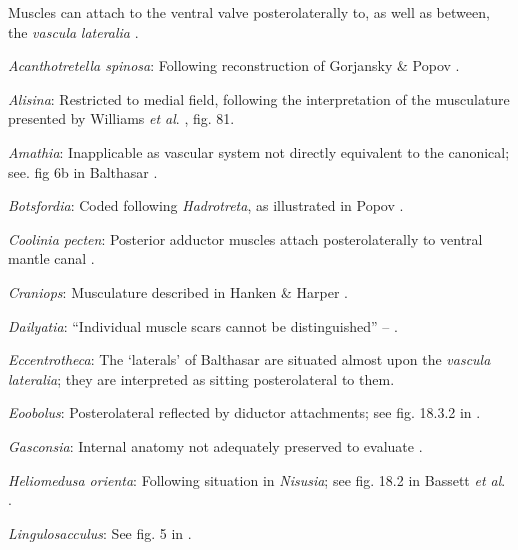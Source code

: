 \documentclass[openany]{book}
\theoremstyle{definition}
\theoremstyle{definition}
\theoremstyle{definition}
\theoremstyle{remark}
\begin{document}
Muscles can attach to the ventral valve posterolaterally to, as well as
between, the \emph{vascula} \emph{lateralia}
\citep{Popov1992TheCambrian}.

\hypertarget{Acanthotretella_spinosa-coding-74}{}
\emph{Acanthotretella spinosa}: Following reconstruction of Gorjansky \&
Popov \citeyearpar{Gorjansky1986Onthe}.

\hypertarget{Alisina-coding-74}{}
\emph{Alisina}: Restricted to medial field, following the interpretation
of the musculature presented by Williams \emph{et al}.
\citeyearpar{Williams2000LinguliformeaCraniiformea}, fig. 81.

\hypertarget{Amathia-coding-74}{}
\emph{Amathia}: Inapplicable as vascular system not directly equivalent
to the canonical; see. fig 6b in Balthasar
\citeyearpar{Balthasar2009Thebrachiopod}.

\hypertarget{Botsfordia-coding-74}{}
\emph{Botsfordia}: Coded following \emph{Hadrotreta}, as illustrated in
Popov \citeyearpar{Popov1992TheCambrian}.

\hypertarget{Coolinia_pecten-coding-74}{}
\emph{Coolinia pecten}: Posterior adductor muscles attach
posterolaterally to ventral mantle canal \citep{Robinson2014Themuscles}.

\hypertarget{Craniops-coding-74}{}
\emph{Craniops}: Musculature described in Hanken \& Harper
\citeyearpar{Hanken1985Thetaxonomy}.

\hypertarget{Dailyatia-coding-74}{}
\emph{Dailyatia}: ``Individual muscle scars cannot be distinguished'' --
\citet{Holmer2006Aspinose}.

\hypertarget{Eccentrotheca-coding-74}{}
\emph{Eccentrotheca}: The `laterals' of Balthasar \citeyearpar[fig.
5]{Balthasar2009Thebrachiopod} are situated almost upon the
\emph{vascula} \emph{lateralia}; they are interpreted as sitting
posterolateral to them.

\hypertarget{Eoobolus-coding-74}{}
\emph{Eoobolus}: Posterolateral reflected by diductor attachments; see
fig. 18.3.2 in \citet{Bassett2001Functionalmorphology}.

\hypertarget{Gasconsia-coding-74}{}
\emph{Gasconsia}: Internal anatomy not adequately preserved to evaluate
\citep{Nikitin1984}.

\hypertarget{Heliomedusa_orienta-coding-74}{}
\emph{Heliomedusa orienta}: Following situation in \emph{Nisusia}; see
fig. 18.2 in Bassett \emph{et al}.
\citeyearpar{Bassett2001Functionalmorphology}.

\hypertarget{Lingulosacculus-coding-74}{}
\emph{Lingulosacculus}: See fig. 5 in \citet{Holmer1997EarlyCambrian}.
\end{document}
